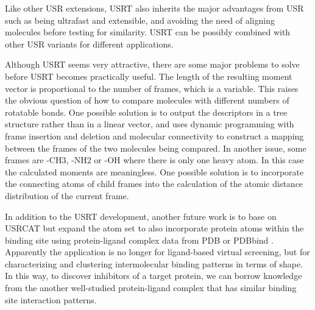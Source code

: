 Like other USR extensions, USRT also inherits the major advantages from USR such as being ultrafast and extensible, and avoiding the need of aligning molecules before testing for similarity. USRT can be possibly combined with other USR variants \citep{1333,1338,1331} for different applications.

Although USRT seems very attractive, there are some major problems to solve before USRT becomes practically useful. The length of the resulting moment vector is proportional to the number of frames, which is a variable. This raises the obvious question of how to compare molecules with different numbers of rotatable bonds. One possible solution is to output the descriptors in a tree structure rather than in a linear vector, and uses dynamic programming with frame insertion and deletion and molecular connectivity to construct a mapping between the frames of the two molecules being compared. In another issue, some frames are -CH3, -NH2 or -OH where there is only one heavy atom. In this case the calculated moments are meaningless. One possible solution is to incorporate the connecting atoms of child frames into the calculation of the atomic distance distribution of the current frame.

In addition to the USRT development, another future work is to base on USRCAT \citep{1331} but expand the atom set to also incorporate protein atoms within the binding site using protein-ligand complex data from PDB \citep{540,537} or PDBbind \citep{529,530,1426}. Apparently the application is no longer for ligand-based virtual screening, but for characterizing and clustering intermolecular binding patterns in terms of shape. In this way, to discover inhibitors of a target protein, we can borrow knowledge from the another well-studied protein-ligand complex that has similar binding site interaction patterns.

\chapterend
